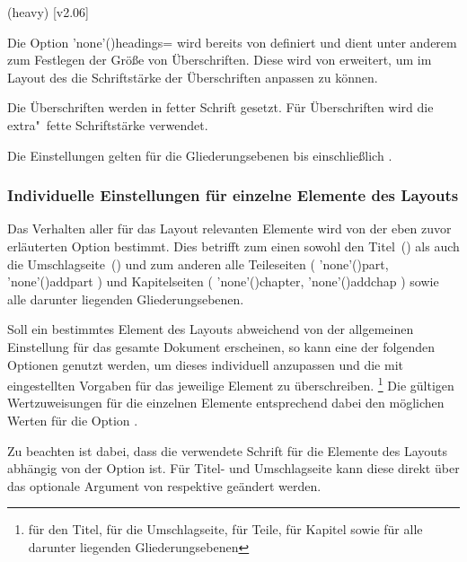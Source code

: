 \begin{DeclareEntity*}{}
\begin{DeclareEntity*}{}
\begin{DeclareEntity*}{}
\begin{Declaration}
  {}
  (heavy)
  [v2.06]
\printdeclarationlist[Schriftstärke]

Die Option \Option'none'(){headings=\PMisc} wird bereits 
von \KOMAScript{} definiert und dient unter anderem zum Festlegen der Größe von 
Überschriften. Diese wird von \TUDScript erweitert, um im Layout des \CDs die 
Schriftstärke der Überschriften anpassen zu können.
\begin{DeclareValues}{}
  Die Überschriften werden in fetter Schrift gesetzt.
  Für Überschriften wird die extra"~fette Schriftstärke verwendet.
\end{DeclareValues}
Die Einstellungen gelten für die Gliederungsebenen bis einschließlich 
.
\end{Declaration}



\subsubsection{Individuelle Einstellungen für einzelne Elemente des Layouts}

Das Verhalten aller für das Layout relevanten Elemente wird von der eben zuvor 
erläuterten Option  bestimmt. Dies betrifft zum einen sowohl 
den Titel~() als auch die Umschlagseite~() 
und zum anderen alle Teileseiten
(%
  \Macro'none'(){part}, 
  \Macro'none'(){addpart}%
)
und Kapitelseiten 
(%
  \Macro'none'(){chapter}, 
  \Macro'none'(){addchap}%
)
sowie alle darunter liegenden Gliederungsebenen.

Soll ein bestimmtes Element des Layouts abweichend von der allgemeinen 
Einstellung für das gesamte Dokument erscheinen, so kann eine der folgenden 
Optionen genutzt werden, um dieses individuell anzupassen und die mit 
 eingestellten Vorgaben für das jeweilige Element zu 
überschreiben.%
\footnote{%
   für den Titel,  für die Umschlagseite,
   für Teile,  für Kapitel sowie
   für alle darunter liegenden Gliederungsebenen%
}
Die gültigen Wertzuweisungen für die einzelnen Elemente entsprechend dabei den 
möglichen Werten für die Option . 

Zu beachten ist dabei, dass die verwendete Schrift für die Elemente des Layouts 
abhängig von der Option  ist. Für Titel- und Umschlagseite
kann diese direkt über das optionale Argument von  respektive 
 geändert werden.


\end{DeclareEntity*}
\end{DeclareEntity*}
\end{DeclareEntity*}
